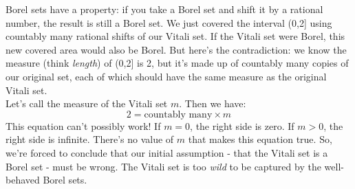 Borel sets have a property: if you take a Borel set and shift it by a rational number, the result is still a Borel set. We just covered the interval (0,2] using countably many rational shifts of our Vitali set.
If the Vitali set were Borel, this new covered area would also be Borel. But here's the contradiction: we know the measure (think \textit{length}) of (0,2] is 2, but it's made up of countably many copies of our original set, each of which should have the same measure as the original Vitali set.\\

Let's call the measure of the Vitali set $m$. Then we have:
\[
2 = \text{countably many} \times m
\]
This equation can't possibly work! If $m = 0$, the right side is zero. If $m > 0$, the right side is infinite. There's no value of $m$ that makes this equation true. So, we're forced to conclude that our initial assumption - that the Vitali set is a Borel set - must be wrong. The Vitali set is too \textit{wild} to be captured by the well-behaved Borel sets.
